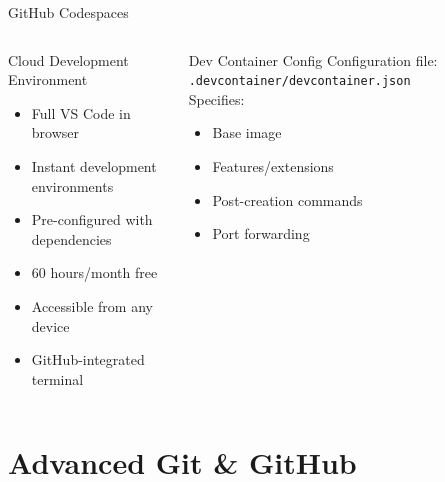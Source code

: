 \documentclass[aspectratio=169]{beamer}
\begin{document}
	\begin{frame}{GitHub Codespaces}
		\begin{columns}
			\begin{block}{Cloud Development Environment}
				\begin{itemize}
					\item Full VS Code in browser
					\item Instant development environments
					\item Pre-configured with dependencies
					\item 60 hours/month free
					\item Accessible from any device
					\item GitHub-integrated terminal
				\end{itemize}
			\end{block}
			
			\begin{exampleblock}{Dev Container Config}
				Configuration file: \texttt{.devcontainer/devcontainer.json}\\
				\vspace{0.2cm}
				Specifies:
				\begin{itemize}
					\item Base image
					\item Features/extensions
					\item Post-creation commands
					\item Port forwarding
				\end{itemize}
			\end{exampleblock}
		\end{columns}
	\end{frame}
	
	\section{Advanced Git \& GitHub}
	
\end{document}
